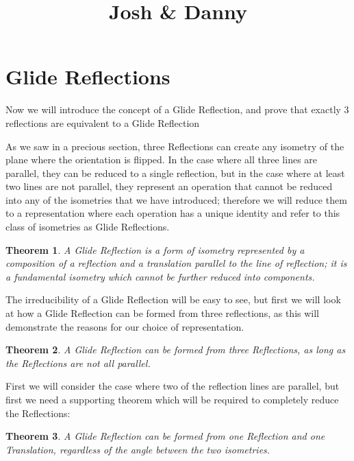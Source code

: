 \documentclass[11pt]{article}
\newtheorem{theorem}{Theorem}[section]
\theoremstyle{definition}
\begin{document}


\title{Josh & Danny}

\maketitle

\section{Glide Reflections}
Now we will introduce the concept of a Glide Reflection, and prove that exactly
3 reflections are equivalent to a Glide Reflection

As we saw in a precious section, three Reflections can create any isometry of
the plane where the orientation is flipped. In the case where all three lines
are parallel, they can be reduced to a single reflection, but in the case where
at least two lines are not parallel, they represent an operation that cannot be
reduced into any of the isometries that we have introduced; therefore we will
reduce them to a representation where each operation has a unique identity and
refer to this class of isometries as Glide Reflections.

\begin{theorem}\label{Glide Reflection}
  A Glide Reflection is a form of isometry represented by a composition of a
reflection and a translation parallel to the line of reflection; it is a
fundamental isometry which cannot be further reduced into components.
\end{theorem}

The irreducibility of a Glide Reflection will be easy to see, but first we will
look at how a Glide Reflection can be formed from three reflections, as this
will demonstrate the reasons for our choice of representation.

\begin{theorem}\label{3 Reflections form a Glide Reflection}
  A Glide Reflection can be formed from three Reflections, as long as the
  Reflections are not all parallel.
\end{theorem}

First we will consider the case where two of the reflection lines are parallel,
but first we need a supporting theorem which will be required to completely
reduce the Reflections:

\begin{theorem}\label{Glide Reflection from a Reflection and a Translation}
  A Glide Reflection can be formed from one Reflection and one Translation,
  regardless of the angle between the two isometries.
\end{theorem}
\end{document}
